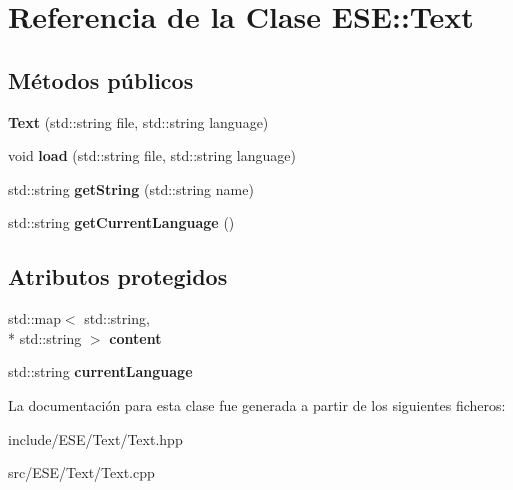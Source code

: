 \hypertarget{class_e_s_e_1_1_text}{\section{Referencia de la Clase E\-S\-E\-:\-:Text}
\label{class_e_s_e_1_1_text}
}
\subsection*{Métodos públicos}
\begin{DoxyCompactItemize}
\item 
\hypertarget{class_e_s_e_1_1_text_a5d3237d7ab89c455431bb0f4a5f9eeaf}{{\bfseries Text} (std\-::string file, std\-::string language)}\label{class_e_s_e_1_1_text_a5d3237d7ab89c455431bb0f4a5f9eeaf}

\item 
\hypertarget{class_e_s_e_1_1_text_a2675ac2e591125b1596fd974690f1959}{void {\bfseries load} (std\-::string file, std\-::string language)}\label{class_e_s_e_1_1_text_a2675ac2e591125b1596fd974690f1959}

\item 
\hypertarget{class_e_s_e_1_1_text_ab6d418629ec56847f887d15de644d382}{std\-::string {\bfseries get\-String} (std\-::string name)}\label{class_e_s_e_1_1_text_ab6d418629ec56847f887d15de644d382}

\item 
\hypertarget{class_e_s_e_1_1_text_ae30f8644d8994d366005f97ca6a73922}{std\-::string {\bfseries get\-Current\-Language} ()}\label{class_e_s_e_1_1_text_ae30f8644d8994d366005f97ca6a73922}

\end{DoxyCompactItemize}
\subsection*{Atributos protegidos}
\begin{DoxyCompactItemize}
\item 
\hypertarget{class_e_s_e_1_1_text_a4ac577bffe650d9a49f5793f52e04a8d}{std\-::map$<$ std\-::string, \\*
std\-::string $>$ {\bfseries content}}\label{class_e_s_e_1_1_text_a4ac577bffe650d9a49f5793f52e04a8d}

\item 
\hypertarget{class_e_s_e_1_1_text_ac108b56c1a1e7b49b1c14c5a9076782e}{std\-::string {\bfseries current\-Language}}\label{class_e_s_e_1_1_text_ac108b56c1a1e7b49b1c14c5a9076782e}

\end{DoxyCompactItemize}


La documentación para esta clase fue generada a partir de los siguientes ficheros\-:\begin{DoxyCompactItemize}
\item 
include/\-E\-S\-E/\-Text/Text.\-hpp\item 
src/\-E\-S\-E/\-Text/Text.\-cpp\end{DoxyCompactItemize}
